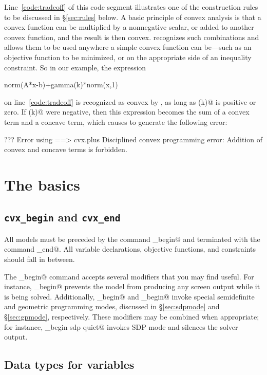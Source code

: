 \documentclass[12pt]{article}
\begin{document}
Line~\ref{code:tradeoff} of this code segment illustrates one of the
construction rules to be discussed in \S\ref{sec:rules} below. 
A basic principle of convex analysis is that a convex function
can be multiplied by a nonnegative scalar,
or added to another convex function, and the result
is then convex. 
\cvx recognizes such combinations and allows
them to be used anywhere a simple convex function can be---such as 
an objective function to be minimized, or on the appropriate side 
of an inequality constraint. So in our example, the expression
\begin{code}
	norm(A*x-b)+gamma(k)*norm(x,1)
\end{code}
on line~\ref{code:tradeoff}
is recognized as convex by \cvx, as long as \verb@gamma(k)@
is positive or zero. If \verb@gamma(k)@ were negative, then
this expression becomes the sum of a convex term and a concave
term, which causes \cvx
to generate the following error:
\begin{code}
??? Error using ==> cvx.plus
Disciplined convex programming error:
Addition of convex and concave terms is forbidden.
\end{code}

\newpage
\section{The basics}

\subsection{\texttt{cvx\_begin} and \texttt{cvx\_end}}

All \cvx models must be preceded by the command \verb@cvx_begin@
and terminated with the command \verb@cvx_end@. All variable
declarations, objective functions, and constraints should fall
in between.

The \verb@cvx_begin@ command accepts several modifiers that you 
may find useful. For
instance, \verb@cvx_begin@ \verb@quiet@ prevents the model from producing
any screen output while it is being solved. Additionally,
\verb@cvx_begin@ \verb@sdp@ and \verb@cvx_begin@ \verb@gp@ invoke special
semidefinite and geometric programming modes, discussed in 
\S\ref{sec:sdpmode} and \S\ref{sec:gpmode}, respectively.
These modifiers may be combined when appropriate; for instance,
\verb@cvx_begin sdp quiet@ invokes SDP mode and silences the solver
output.

\subsection{Data types for variables}
\end{document}

